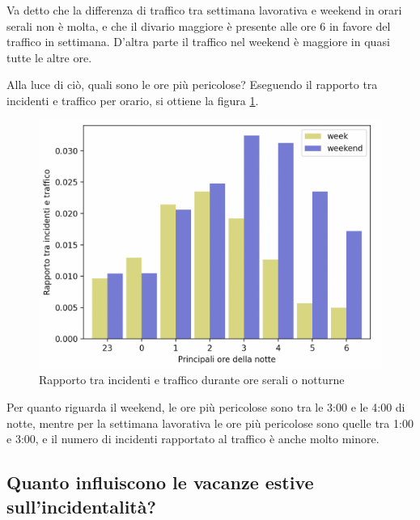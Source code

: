 \documentclass[a4paper]{report}
\begin{document}
Va detto che la differenza di traffico tra settimana lavorativa e weekend in orari serali non è molta, 
e che il divario maggiore è presente alle ore 6 in favore del traffico in settimana.
D'altra parte il traffico nel weekend è maggiore in quasi tutte le altre ore.

Alla luce di ciò, quali sono le ore più pericolose?
Eseguendo il rapporto tra incidenti e traffico per orario, si ottiene la figura 
\ref{fig:rapp-inc-traff}.

\begin{figure}
    \includegraphics[width=\linewidth]{../src/area_c/rapporto_inc_traff.png}
    \caption{Rapporto tra incidenti e traffico durante ore serali o notturne}
    \label{fig:rapp-inc-traff}
\end{figure}

Per quanto riguarda il weekend, le ore più pericolose sono tra le 3:00 e le 4:00 di notte, mentre per 
la settimana lavorativa le ore più pericolose sono quelle tra 1:00 e 3:00, e il numero di 
incidenti rapportato al traffico è anche molto minore. 

\subsection{Quanto influiscono le vacanze estive sull'incidentalità?}
\end{document}
